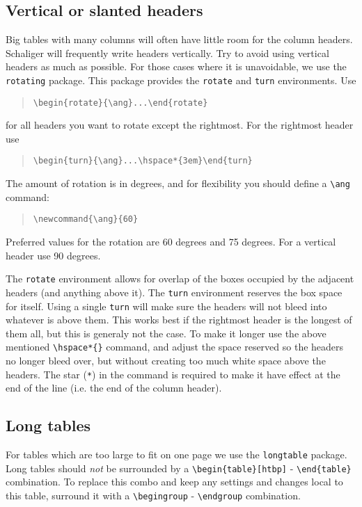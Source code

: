 \documentclass{report}
\begin{document}
\subsection{Vertical or slanted headers}
Big tables with many columns will often have little room for the column headers.
Schaliger will frequently write headers vertically.
Try to avoid using vertical headers as much as possible.
For those cases where it is unavoidable, we use the \verb+rotating+ package.
This package provides the \verb+rotate+ and \verb+turn+ environments.
Use 
\begin{quote}
\verb+\begin{rotate}{\ang}...\end{rotate}+
\end{quote}
for all headers you want to rotate except the rightmost.
For the rightmost header use
\begin{quote}
\verb+\begin{turn}{\ang}...\hspace*{3em}\end{turn}+
\end{quote}
The amount of rotation is in degrees, and for flexibility you should define
a \verb+\ang+ command:
\begin{quote}
\verb+\newcommand{\ang}{60}+
\end{quote}
Preferred values for the rotation are 60 degrees and 75 degrees.
For a vertical header use 90 degrees.

The \verb+rotate+ environment allows for overlap of the boxes occupied by
the adjacent headers (and anything above it).
The \verb+turn+ environment reserves the box space for itself.
Using a single \verb+turn+ will make sure the headers will not bleed into
whatever is above them.
This works best if the rightmost header is the longest of them all, but this
is generaly not the case. To make it longer use the above mentioned
\verb+\hspace*{}+ command, and adjust the space reserved so the headers no longer
bleed over, but without creating too much white space above the headers.
The star (\verb+*+) in the command is required to make it have effect at
the end of the line (i.e. the end of the column header).

\subsection{Long tables}
For tables which are too large to fit on one page we use the \verb+longtable+
package.
Long tables should \emph{not} be surrounded by a
\verb+\begin{table}[htbp]+ - \verb+\end{table}+ combination.
To replace this combo and keep any settings and changes local to this table,
surround it with a \verb+\begingroup+ - \verb+\endgroup+ combination.
\end{document}
